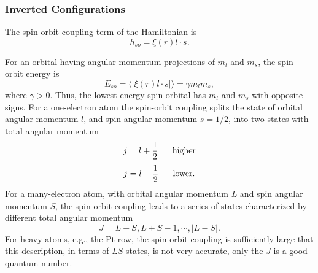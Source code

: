 \subsubsection{Inverted Configurations}

The spin-orbit coupling term of the Hamiltonian is
\begin{equation}
h_{so} = \xi (r) l \cdot s .
\end{equation}

For an orbital having angular momentum projections of $m_l$ and $m_s$,
the spin orbit energy is
\begin{equation}
E_{so} = \langle | \xi (r) l \cdot s | \rangle = \gamma m_l m_s ,
\end{equation}
where $\gamma > 0$.  Thus, the lowest energy spin orbital has $m_l$ 
and $m_s$ with opposite signs.  For a one-electron atom the spin-orbit 
coupling splits the state of orbital angular momentum $l$, and 
spin angular momentum $s = 1/2$, into two states with total angular momentum
\begin{equation}
j = l + {1 \over 2} ~~~~~\mathrm{higher}
\end{equation}
\begin{equation}
j = l - {1 \over 2} ~~~~~\mathrm{lower}.
\end{equation}
For a many-electron atom, with orbital angular momentum $L$ and 
spin angular momentum $S$, the spin-orbit coupling leads to a 
series of states characterized by different total angular momentum
\begin{equation}
J = L + S, L + S - 1, \cdots , | L - S |.
\end{equation}
For heavy atoms, e.g., the Pt row, the spin-orbit coupling is 
sufficiently large that this description, in terms of $LS$ states, 
is not very accurate, only the $J$ is a good quantum number.

